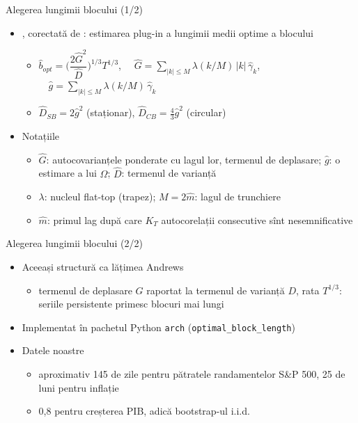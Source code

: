 \begin{frame}{Alegerea lungimii blocului (1/2)}
\itemsize{\small}
\begin{itemize}
    \item {}, corectată de : estimarea plug-in a lungimii medii optime a blocului
    \begin{itemize}
        \item $\hat b_{opt} = \Big(\dfrac{2\hat G^2}{\hat D}\Big)^{1/3} T^{1/3}$, $\quad \hat G = \sum_{|k|\le M}\lambda(k/M)\,|k|\,\hat\gamma_k$, $\quad \hat g = \sum_{|k|\le M}\lambda(k/M)\,\hat\gamma_k$
        \item $\hat D_{SB} = 2\hat g^2$ (staționar), $\hat D_{CB} = \tfrac{4}{3}\hat g^2$ (circular)
    \end{itemize}
    \item Notațiile
    \begin{itemize}
        \item $\hat G$: autocovarianțele ponderate cu lagul lor, termenul de deplasare; $\hat g$: o estimare a lui $\Omega$; $\hat D$: termenul de varianță
        \item $\lambda$: nucleul flat-top (trapez); $M = 2\hat m$: lagul de trunchiere
        \item $\hat m$: primul lag după care $K_T$ autocorelații consecutive sînt nesemnificative
    \end{itemize}
\end{itemize}
\end{frame}

\begin{frame}{Alegerea lungimii blocului (2/2)}
\itemsize{\small}
\begin{itemize}
    \item Aceeași structură ca lățimea Andrews
    \begin{itemize}
        \item termenul de deplasare $G$ raportat la termenul de varianță $D$, rata $T^{1/3}$: seriile persistente primesc blocuri mai lungi
    \end{itemize}
    \item Implementat în pachetul Python \texttt{arch} (\texttt{optimal\_block\_length})
    \item Datele noastre
    \begin{itemize}
        \item aproximativ 145 de zile pentru pătratele randamentelor S\&P 500, 25 de luni pentru inflație
        \item 0{,}8 pentru creșterea PIB, adică bootstrap-ul i.i.d.
    \end{itemize}
\end{itemize}
\end{frame}

